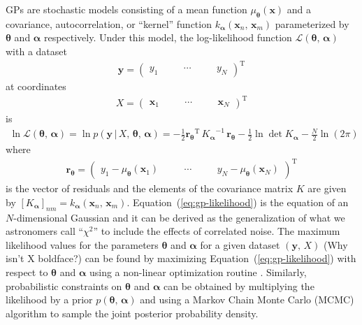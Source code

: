 \documentclass[manuscript, letterpaper]{aastex6}
\makeatletter
\let\origsection\section
\renewcommand\section{\@ifstar{\starsection}{\nostarsection}}
\newcommand\nostarsection[1]{\sectionprelude\origsection{#1}}
\newcommand\starsection[1]{\sectionprelude\origsection*{#1}}
\newcommand\sectionprelude{\vspace{1em}}
\renewcommand{\eqref}[1]{\ref{eq:#1}}
\newcommand{\Eq}[1]{Equation~(\eqref{#1})}
\newcommand{\eq}[1]{\Eq{#1}}
\newcommand{\eqlabel}[1]{\label{eq:#1}}
\newcommand{\sectlabel}[1]{\label{sect:#1}}
\newcommand{\T}{\ensuremath{\mathrm{T}}}
\newcommand{\bvec}[1]{{\ensuremath{\boldsymbol{#1}}}}
\newcommand{\response}[1]{{\color{blue}#1}}
\makeatother
\begin{document}
\section{Gaussian processes}\sectlabel{gps}

GPs are stochastic models consisting of a mean function
$\mu_\bvec{\theta}(\bvec{x})$ and a covariance, autocorrelation, or ``kernel''
function $k_\bvec{\alpha}(\bvec{x}_n,\,\bvec{x}_m)$ parameterized by
$\bvec{\theta}$ and $\bvec{\alpha}$ respectively.
Under this model, \response{the log-likelihood function $\mathcal{L}
(\bvec{\theta},\,\bvec{\alpha})$} with a dataset
\begin{eqnarray}
\bvec{y} = \left(\begin{array}{ccccc}
    y_1\quad && \cdots\quad && y_N
\end{array}\right)^\T
\end{eqnarray}
at coordinates
\begin{eqnarray}
X = \left(\begin{array}{ccccc}
    \bvec{x}_1\quad && \cdots\quad && \bvec{x}_N
\end{array}\right)^\T
\end{eqnarray}
is
\begin{eqnarray}\eqlabel{gp-likelihood}
\ln \mathcal{L} (\bvec{\theta},\,\bvec{\alpha}) =
\ln{p(\bvec{y}\,|\,{X,\,\bvec{\theta}},\,\bvec{\alpha})} =
    -\frac{1}{2} {\bvec{r}_\bvec{\theta}}^\T\,{K_\bvec{\alpha}}^{-1}\,
        \bvec{r}_\bvec{\theta}
    -\frac{1}{2}\ln\det K_\bvec{\alpha}
    - \frac{N}{2} \ln{(2\pi)}
\end{eqnarray}
where
\begin{eqnarray}
    \bvec{r}_\bvec{\theta} = \left(\begin{array}{ccccc}
    y_1 - \mu_\bvec{\theta}(\bvec{x}_1)\quad && \cdots\quad &&
    y_N - \mu_\bvec{\theta}(\bvec{x}_N)
\end{array}\right)^\T
\end{eqnarray}
is the vector of residuals and the elements of the covariance matrix $K$ are
given by $[K_\bvec{\alpha}]_{nm} = k_\bvec{\alpha}(\bvec{x}_n,\,\bvec{x}_m)$.
\eq{gp-likelihood} is the equation of an $N$-dimensional Gaussian and it can
be derived as the generalization of what we astronomers call ``$\chi^2$''
to include the effects of correlated noise.
The maximum likelihood values for the parameters $\bvec{\theta}$ and
$\bvec{\alpha}$ for a given dataset $(\bvec{y},\,X)$ \response{(Why
isn't X boldface?)} can be found by
maximizing \eq{gp-likelihood} with respect to $\bvec{\theta}$ and
$\bvec{\alpha}$ using a non-linear optimization routine \citep{Nocedal:2006}.
Similarly, probabilistic constraints on $\bvec{\theta}$ and $\bvec{\alpha}$
can be obtained by multiplying the likelihood by a prior
$p(\bvec{\theta},\,\bvec{\alpha})$ and using a Markov Chain Monte Carlo (MCMC)
algorithm to sample the joint posterior probability density.
\end{document}
